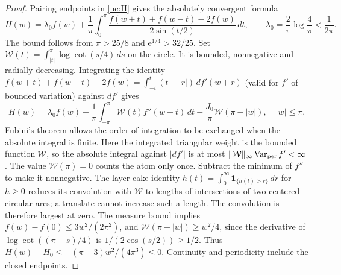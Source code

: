 \begin{proof}
Pairing endpoints in \eqref{uc:H} gives the absolutely convergent
formula
\[
 H(w)=\lambda_0f(w)+\frac1\pi\int_0^\pi
 \frac{f(w+t)+f(w-t)-2f(w)}{2\sin(t/2)}\,dt,
 \qquad \lambda_0=\frac2\pi\log\frac4\pi<\frac1{2\pi}.
\]
The bound follows from $\pi>25/8$ and $\mathrm e^{1/4}>32/25$.
Set $\mathcal{W}(t)=\int_{|t|}^\pi\log\cot(s/4)\,ds$ on the circle.
It is bounded, nonnegative and radially decreasing. Integrating the
identity
$f(w+t)+f(w-t)-2f(w)=\int_{-t}^t(t-|r|)\,df'(w+r)$
(valid for $f'$ of bounded variation) against
$df'$ gives
\[
 H(w)=\lambda_0f(w)+\frac1\pi\int_{-\pi}^{\pi}\mathcal{W}(t)f''(w+t)\,dt
                  -\frac{J_0}\pi \mathcal{W}(\pi-|w|),\quad |w|\leq\pi.
\]
Fubini's theorem allows the order of integration to be exchanged when
the absolute integral is finite. Here the integrated triangular weight
is the bounded function $\mathcal W$, so the absolute integral against
$|df'|$ is at most $\|\mathcal W\|_\infty\operatorname{Var}_{\rm per}f'<\infty$.
The value $\mathcal W(\pi)=0$ counts the atom only once. Subtract the
minimum of $f''$ to make it nonnegative. The layer-cake identity
$h(t)=\int_0^\infty\mathbf1_{\{h(t)>r\}}\,dr$ for $h\geq0$
reduces its convolution with $\mathcal{W}$ to lengths
of intersections of two centered circular arcs; a translate cannot
increase such a length. The convolution is therefore largest at zero.
The measure bound implies $f(w)-f(0)\leq3w^2/(2\pi^2)$, and
$\mathcal{W}(\pi-|w|)\geq w^2/4$, since the derivative of
$\log\cot((\pi-s)/4)$ is $1/(2\cos(s/2))\geq1/2$.
Thus $H(w)-H_0\leq-(\pi-3)w^2/(4\pi^3)\leq0$.
Continuity and periodicity include the closed endpoints.
\end{proof}


